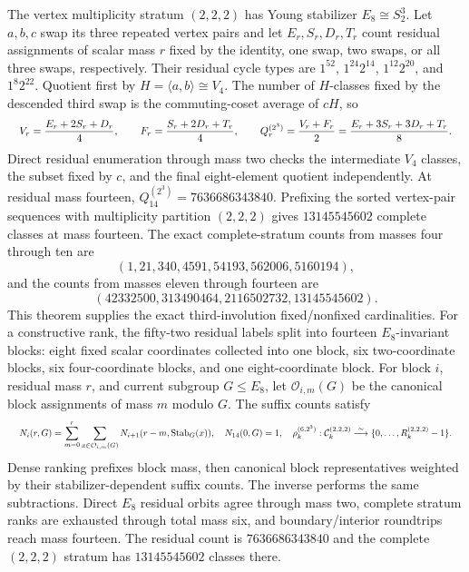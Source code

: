 \documentclass{article}
\newcommand{\fitmath}[1]{\resizebox{0.99\linewidth}{!}{$\displaystyle #1$}}
\begin{document}
The vertex multiplicity stratum $(2,2,2)$ has Young stabilizer
$E_8\cong S_2^3$. Let $a,b,c$ swap its three repeated vertex pairs and let
$E_r,S_r,D_r,T_r$ count residual assignments of scalar mass $r$ fixed by the
identity, one swap, two swaps, or all three swaps, respectively. Their residual
cycle types are $1^{52}$, $1^{24}2^{14}$, $1^{12}2^{20}$, and
$1^8 2^{22}$. Quotient first by $H=\langle a,b\rangle\cong V_4$. The number
of $H$-classes fixed by the descended third swap is the commuting-coset average
of $cH$, so
\begin{equation}
  \fitmath{%
    V_r=\frac{E_r+2S_r+D_r}{4},\qquad
    F_r=\frac{S_r+2D_r+T_r}{4},\qquad
    Q_r^{(2^3)}=\frac{V_r+F_r}{2}
      =\frac{E_r+3S_r+3D_r+T_r}{8}.
  }
  \label{eq:optimization-crazy-sextuple-s6-s2-cubed-decomposition}
\end{equation}
Direct residual enumeration through mass two checks the intermediate $V_4$
classes, the subset fixed by $c$, and the final eight-element quotient
independently. At residual mass fourteen,
$Q_{14}^{(2^3)}=7636686343840$. Prefixing the sorted vertex-pair sequences with
multiplicity partition $(2,2,2)$ gives $13145545602$ complete classes at mass
fourteen. The exact complete-stratum counts from masses four through ten are
\[
  (1,21,340,4591,54193,562006,5160194),
\]
and the counts from masses eleven through fourteen are
\[
  (42332500,313490464,2116502732,13145545602).
\]
This theorem supplies the exact third-involution fixed/nonfixed cardinalities.
For a constructive rank, the fifty-two residual labels split into fourteen
$E_8$-invariant blocks: eight fixed scalar coordinates collected into one block,
six two-coordinate blocks, six four-coordinate blocks, and one eight-coordinate
block. For block $i$, residual mass $r$, and current subgroup $G\leq E_8$, let
$\mathcal O_{i,m}(G)$ be the canonical block assignments of mass $m$ modulo $G$.
The suffix counts satisfy
\begin{equation}
  \fitmath{%
    N_i(r,G)=\sum_{m=0}^{r}\sum_{x\in\mathcal O_{i,m}(G)}
      N_{i+1}(r-m,\operatorname{Stab}_G(x)),
    \quad N_{14}(0,G)=1,
    \quad
    \rho_k^{(6,2^3)}:\mathcal C_k^{(2,2,2)}
      \overset{\sim}{\longrightarrow}\{0,\ldots,R_k^{(2,2,2)}-1\}.
  }
  \label{eq:optimization-crazy-sextuple-s6-s2-cubed-vertex-ranking}
\end{equation}
Dense ranking prefixes block mass, then canonical block representatives weighted
by their stabilizer-dependent suffix counts. The inverse performs the same
subtractions. Direct $E_8$ residual orbits agree through mass two, complete
stratum ranks are exhausted through total mass six, and boundary/interior
roundtrips reach mass fourteen. The residual count is $7636686343840$ and the
complete $(2,2,2)$ stratum has $13145545602$ classes there.
\end{document}
